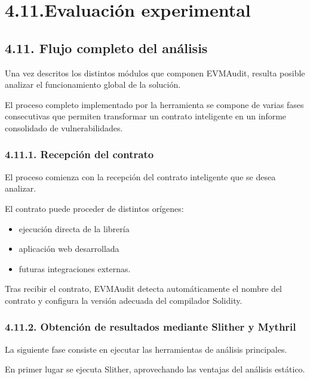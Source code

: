 \section{4.11.Evaluación experimental}\label{evaluaciuxf3n-experimental}

\subsection{4.11. Flujo completo del
análisis}\label{flujo-completo-del-anuxe1lisis}

Una vez descritos los distintos módulos que componen EVMAudit, resulta
posible analizar el funcionamiento global de la solución.

El proceso completo implementado por la herramienta se compone de varias
fases consecutivas que permiten transformar un contrato inteligente en
un informe consolidado de vulnerabilidades.

\subsubsection{4.11.1. Recepción del
contrato}\label{recepciuxf3n-del-contrato}

El proceso comienza con la recepción del contrato inteligente que se
desea analizar.

El contrato puede proceder de distintos orígenes:

\begin{itemize}
\tightlist
\item
  ejecución directa de la librería
\item
  aplicación web desarrollada
\item
  futuras integraciones externas.
\end{itemize}

Tras recibir el contrato, EVMAudit detecta automáticamente el nombre del
contrato y configura la versión adecuada del compilador Solidity.

\subsubsection{4.11.2. Obtención de resultados mediante Slither y
Mythril}\label{obtenciuxf3n-de-resultados-mediante-slither-y-mythril}

La siguiente fase consiste en ejecutar las herramientas de análisis
principales.

En primer lugar se ejecuta Slither, aprovechando las ventajas del
análisis estático.

